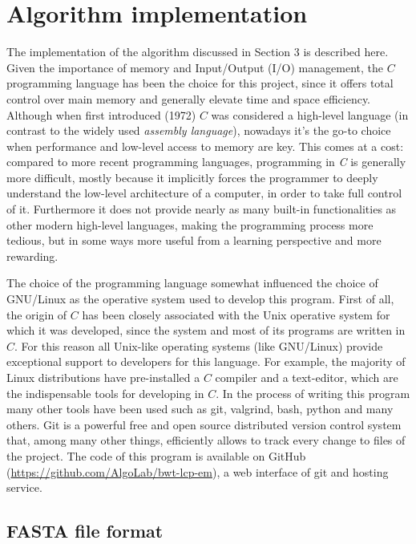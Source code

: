\documentclass[a4paper,12pt, oneside]{article}
\begin{document}
\newpage
\section{Algorithm implementation}

The implementation of the algorithm discussed in Section 3 is described here. Given the importance of memory and Input/Output (I/O) management, the $C$ programming language has been the choice for this project, since it offers total control over main memory and generally elevate time and space efficiency. Although when first introduced (1972) $C$ was considered a high-level language (in contrast to the widely used \textit{assembly language}), nowadays it's the go-to choice when performance and low-level access to memory are key. This comes at a cost: compared to more recent programming languages, programming in \textit{C} is generally more difficult, mostly because it implicitly forces the programmer to deeply understand the low-level architecture of a computer, in order to take full control of it. Furthermore it does not provide nearly as many built-in functionalities as other modern high-level languages, making the programming process more tedious, but in some ways more useful from a learning perspective and more rewarding. 

\par

The choice of the programming language somewhat influenced the choice of GNU/Linux as the operative system used to develop this program. First of all, the origin of $C$ has been closely associated with the Unix operative system for which it was developed, since the system and most of its programs are written in $C$. For this reason all Unix-like operating systems (like GNU/Linux) provide exceptional support to developers for this language. For example, the majority of Linux distributions have pre-installed a $C$ compiler and a text-editor, which are the indispensable tools for developing in $C$. In the process of writing this program many other tools have been used such as git, valgrind, bash, python and many others. Git is a powerful free and open source distributed version control system that, among many other things, efficiently allows to track every change to files of the project. The code of this program is available on GitHub (\url{https://github.com/AlgoLab/bwt-lcp-em}), a web interface of git and hosting service.

\newpage
\subsection{FASTA file format}
\end{document}
